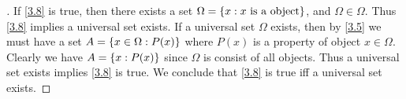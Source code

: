 \begin{proof}[]
  If \cref{3.8} is true, then there exists a set \(\Omega = \left\lbrace x : x \text{ is a object}\right\rbrace\), and \(\Omega \in \Omega\).
  Thus \cref{3.8} implies a universal set exists.
  If a universal set \(\Omega\) exists, then by \cref{3.5} we must have a set \(A = \left\lbrace x \in \Omega : P(x)\right\rbrace\) where \(P(x)\) is a property of object \(x \in \Omega\).
  Clearly we have \(A = \left\lbrace x : P(x)\right\rbrace\) since \(\Omega\) is consist of all objects.
  Thus a universal set exists implies \cref{3.8} is true.
  We conclude that \cref{3.8} is true iff a universal set exists.
\end{proof}
